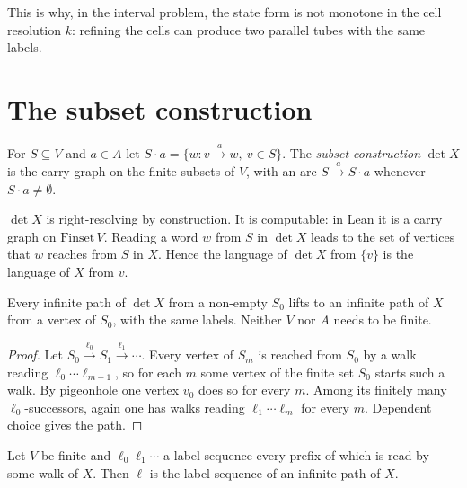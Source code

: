 This is why, in the interval problem, the state form is not monotone in the cell resolution
\(k\): refining the cells can produce two parallel tubes with the same labels.

\section{The subset construction}

\begin{definition}[{\cite[Thm.~3.3.2]{LM95}}]\label{def:det}
For \(S\subseteq V\) and \(a\in A\) let \(S\cdot a=\{w : v\xrightarrow{a}w,\ v\in S\}\). The
\emph{subset construction} \(\det X\) is the carry graph on the finite subsets of \(V\), with an
arc \(S\xrightarrow{a}S\cdot a\) whenever \(S\cdot a\neq\emptyset\).
\end{definition}

\(\det X\) is right-resolving by construction. It is computable: in Lean it is a carry graph on
\(\mathrm{Finset}\,V\). Reading a word \(w\) from \(S\) in \(\det X\) leads to the set of
vertices that \(w\) reaches from \(S\) in \(X\). Hence the language of \(\det X\) from \(\{v\}\)
is the language of \(X\) from \(v\).

\begin{lemma}\label{lem:det-konig}
Every infinite path of \(\det X\) from a non-empty \(S_0\) lifts to an infinite path of \(X\)
from a vertex of \(S_0\), with the same labels. Neither \(V\) nor \(A\) needs to be finite.
\end{lemma}

\begin{proof}
Let \(S_0\xrightarrow{\ell_0}S_1\xrightarrow{\ell_1}\cdots\). Every vertex of \(S_m\) is reached
from \(S_0\) by a walk reading \(\ell_0\cdots\ell_{m-1}\), so for each \(m\) some vertex of the
finite set \(S_0\) starts such a walk. By pigeonhole one vertex \(v_0\) does so for every \(m\).
Among its finitely many \(\ell_0\)-successors, again one has walks reading
\(\ell_1\cdots\ell_{m}\) for every \(m\). Dependent choice gives the path.
\end{proof}

\begin{corollary}\label{cor:konig-labels}
Let \(V\) be finite and \(\ell_0\ell_1\cdots\) a label sequence every prefix of which is read by
some walk of \(X\). Then \(\ell\) is the label sequence of an infinite path of \(X\).
\end{corollary}

